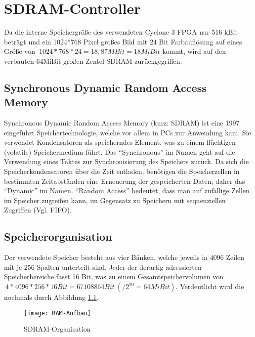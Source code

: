 \chapter{SDRAM-Controller}
\label{cha:SDRAM}

Da die interne Speichergröße des verwendeten Cyclone 3 FPGA nur 516 kBit beträgt und ein 1024*768 Pixel großes Bild mit 24 Bit Farbauflösung auf eines Größe von $\ 1024*768*24=18{,}87 MBit=18MiBit$ kommt, wird auf den verbauten 64MiBit großen Zentel SDRAM zurückgegriffen.

\section{Synchronous Dynamic Random Access Memory}
Synchronous Dynamic Random Access Memory (kurz: SDRAM) ist eine 1997 eingeführt Speichertechnologie, welche vor allem in PCs zur Anwendung kam. Sie verwendet Kondensatoren als speicherndes Element, was zu einem flüchtigen (volatile) Speichermedium führt. Das "`Synchronous"' im Namen geht auf die Verwendung eines Taktes zur Synchronisierung des Speichers zurück. Da sich die Speicherkondensatoren über die Zeit entladen, benötigen die Speicherzellen in bestimmten Zeitabständen eine Erneuerung der gespeicherten Daten, daher das "`Dynamic"' im Namen. "`Random Access"' bedeutet, dass man auf zufällige Zellen im Speicher zugreifen kann, im Gegensatz zu Speichern mit sequenziellen Zugriffen (Vgl. FIFO).

\section{Speicherorganisation}
Der verwendete Speicher besteht aus vier Bänken, welche jeweils in 4096 Zeilen mit je 256 Spalten unterteilt sind. Jeder der derartig adressierten Speicherbereiche fasst 16 Bit, was zu einem Gesamtspeichervolumen von  $\ 4*4096*256*16Bit=67108864Bit~(/2^{20}=64MiBit)$. Verdeutlicht wird die nochmals durch Abbildung \ref{fig:RAM-O}.

%
\begin{figure}[h!]
\centering
\texttt{[image: RAM-Aufbau]} %
\caption{SDRAM-Organisation}
\label{fig:RAM-O}
\end{figure}
%

